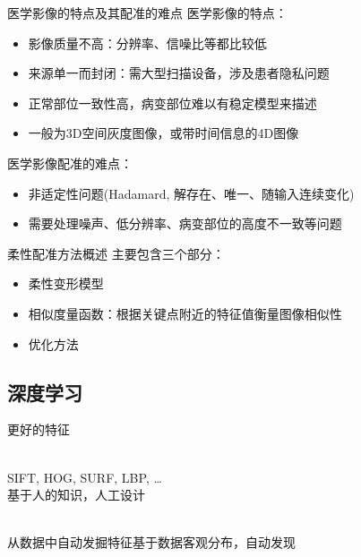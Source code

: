 \documentclass {beamer}
\begin{document}
\begin{frame}{医学影像的特点及其配准的难点}
    医学影像的\alert{特点}：
    \begin{itemize}
        \item 影像质量不高：分辨率、信噪比等都比较低
        \item 来源单一而封闭：需大型扫描设备，涉及患者隐私问题
        \item 正常部位一致性高，病变部位难以有稳定模型来描述
        \item 一般为3D空间灰度图像，或带时间信息的4D图像
    \end{itemize}
    \pause
    医学影像配准的\alert{难点}：
    \begin{itemize}
        \item 非适定性问题(Hadamard, 解存在、唯一、随输入连续变化)
        \item 需要处理噪声、低分辨率、病变部位的高度不一致等问题
    \end{itemize}
\end{frame}

\begin{frame}{柔性配准方法概述}
    主要包含三个部分：
    \begin{itemize}
        \item 柔性变形模型
        \item \alert<2>{相似度量函数：根据关键点附近的特征值衡量图像相似性}
        \item 优化方法
    \end{itemize}
\end{frame}

\subsection{深度学习}

\begin{frame}{更好的特征}
    \begin{description}
        \item[传统特征] \hfill \\
            SIFT, HOG, SURF, LBP, \dots \\
            基于人的知识，\alert{人工设计} \\
        \item<2>[深度学习] \hfill \\
            从数据中自动发掘特征基于数据客观分布，\alert{自动发现}
    \end{description}
\end{frame}
\end{document}
